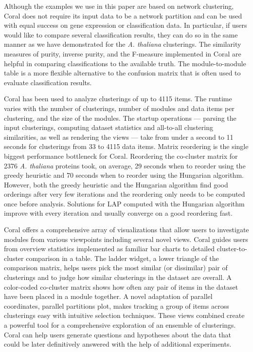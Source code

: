 \documentclass[12pt]{cmuthesis}
\newcommand\Coral{Coral\xspace}
\newcommand{\Athal}{\textit{A. thaliana}\xspace}
\begin{document}
  Although the examples we use in this paper are based on network clustering, \Coral does not require its input data to be a network partition and can be used with equal success on gene expression or classification data. In particular, if users would like to compare several classification results, they can do so in the same manner as we have demonstrated for the \Athal clusterings. The similarity measures of purity, inverse purity, and the F-measure implemented in \Coral are helpful in comparing classifications to the available truth. The module-to-module table is a more flexible alternative to the confusion matrix that is often used to evaluate classification results.

  \Coral has been used to analyze clusterings of up to 4115 items. The runtime varies with the number of clusterings, number of modules and data items per clustering, and the size of the modules. The startup operations --- parsing the input clusterings, computing dataset statistics and all-to-all clustering similarities, as well as rendering the views --- take from under a second to 11 seconds for clusterings from 33 to 4115 data items. Matrix reordering is the single biggest performance bottleneck for \Coral. Reordering the co-cluster matrix for 2376 \Athal proteins took, on average, 29 seconds when to reorder using the greedy heuristic and 70 seconds when to reorder using the Hungarian algorithm. However, both the greedy heuristic and the Hungarian algorithm find good orderings after very few iterations and the reordering only needs to be computed once before analysis. Solutions for LAP computed with the Hungarian algorithm improve with every iteration and usually converge on a good reordering fast.

  \Coral offers a comprehensive array of visualizations that allow users to investigate modules from various viewpoints including several novel views. \Coral guides users from overview statistics implemented as familiar bar charts to detailed cluster-to-cluster comparison in a table. The ladder widget, a lower triangle of the comparison matrix, helps users pick the most similar (or dissimilar) pair of clusterings and to judge how similar clusterings in the dataset are overall. A color-coded co-cluster matrix shows how often any pair of items in the dataset have been placed in a module together. A novel adaptation of parallel coordinates, parallel partitions plot, makes tracking a group of items across clusterings easy with intuitive selection techniques. These views combined create a powerful tool for a comprehensive exploration of an ensemble of clusterings. \Coral can help users generate questions and hypotheses about the data that could be later definitively answered with the help of additional experiments.
\end{document}
